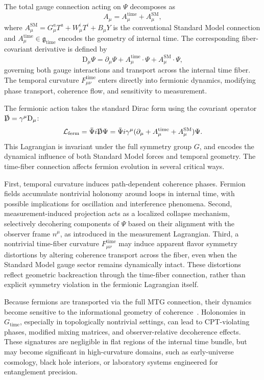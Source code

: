 \documentclass[11pt]{article}
\begin{document}
The total gauge connection acting on \( \Psi \) decomposes as
\begin{equation}
A_\mu = A_\mu^{\mathrm{time}} + A_\mu^{\mathrm{SM}},
\end{equation}
where \( A_\mu^{\mathrm{SM}} = G^a_\mu T^a + W^i_\mu T^i + B_\mu Y \) is the conventional Standard Model connection and \( A_\mu^{\mathrm{time}} \in \mathfrak{g}_{\mathrm{time}} \) encodes the geometry of internal time. The corresponding fiber-covariant derivative is defined by
\begin{equation}
\mathrm{D}_\mu \Psi = \partial_\mu \Psi + A_\mu^{\mathrm{time}} \cdot \Psi + A_\mu^{\mathrm{SM}} \cdot \Psi,
\end{equation}
governing both gauge interactions and transport across the internal time fiber. The temporal curvature \( F_{\mu\nu}^{\mathrm{time}} \) enters directly into fermionic dynamics, modifying phase transport, coherence flow, and sensitivity to measurement.

The fermionic action takes the standard Dirac form using the covariant operator \( \slashed{\mathrm{D}} = \gamma^\mu \mathrm{D}_\mu \):
\begin{equation}
\mathcal{L}_{\mathrm{ferm}} = \bar{\Psi} i \slashed{\mathrm{D}} \Psi = \bar{\Psi} i \gamma^\mu (\partial_\mu + A_\mu^{\mathrm{time}} + A_\mu^{\mathrm{SM}}) \Psi.
\end{equation}
This Lagrangian is invariant under the full symmetry group \( G \), and encodes the dynamical influence of both Standard Model forces and temporal geometry. The time-fiber connection affects fermion evolution in several critical ways.

First, temporal curvature induces path-dependent coherence phases. Fermion fields accumulate nontrivial holonomy around loops in internal time, with possible implications for oscillation and interference phenomena. Second, measurement-induced projection acts as a localized collapse mechanism, selectively decohering components of \( \Psi \) based on their alignment with the observer frame \( n^\mu \), as introduced in the measurement Lagrangian. Third, a nontrivial time-fiber curvature \( F_{\mu\nu}^{\mathrm{time}} \) may induce apparent flavor symmetry distortions by altering coherence transport across the fiber, even when the Standard Model gauge sector remains dynamically intact. These distortions reflect geometric backreaction through the time-fiber connection, rather than explicit symmetry violation in the fermionic Lagrangian itself.

Because fermions are transported via the full MTG connection, their dynamics become sensitive to the informational geometry of coherence~\cite{baumgratz2014quantifying}. Holonomies in \( G_{\mathrm{time}} \), especially in topologically nontrivial settings, can lead to CPT-violating phases, modified mixing matrices, and observer-relative decoherence effects. These signatures are negligible in flat regions of the internal time bundle, but may become significant in high-curvature domains, such as early-universe cosmology, black hole interiors, or laboratory systems engineered for entanglement precision.
\end{document}
